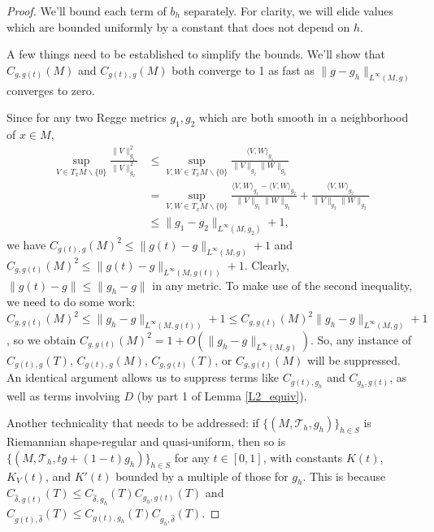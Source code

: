 \documentclass[11pt]{article}
\newcommand{\iprod}[1]{\langle #1 \rangle}
\begin{document}
\begin{proof}
We'll bound each term of $b_h$ separately. For clarity, we will elide values which are bounded uniformly by a constant that does not depend on $h$.

A few things need to be established to simplify the bounds. We'll show that $C_{g,g(t)}(M)$ and $C_{g(t),g}(M)$ both converge to 1 as fast as $\|g - g_h\|_{L^\infty(M,g)}$ converges to zero. 

Since for any two Regge metrics $g_1, g_2$ which are both smooth in a neighborhood of $x \in M$,
\begin{align*}
    \sup_{V \in T_xM \backslash \{0\}} \frac{\|V\|^2_{g_1}}{\|V\|^2_{g_2}} &\le \sup_{V,W \in T_xM \backslash \{0\}} \frac{\iprod{V,W}_{g_1}}{\|V\|_{g_2}\|W\|_{g_2}} \\ &= \sup_{V,W \in T_xM \backslash \{0\}} \frac{\iprod{V,W}_{g_1} - \iprod{V,W}_{g_2}}{\|V\|_{g_2}\|W\|_{g_2}} + \frac{\iprod{V,W}_{g_2}}{\|V\|_{g_2}\|W\|_{g_2}}\\
&\le \|g_1 - g_2\|_{L^\infty(M,g_2)} + 1,
\end{align*}
we have $C_{g(t),g}(M)^2 \le \|g(t) - g\|_{L^\infty(M,g)} + 1$ and $C_{g,g(t)}(M)^2 \le \|g(t) - g\|_{L^\infty(M,g(t))} + 1$. Clearly, $\|g(t) - g\| \le \|g_h - g\|$ in any metric. To make use of the second inequality, we need to do some work: $C_{g,g(t)}(M)^2 \le \|g_h - g\|_{L^\infty(M,g(t))} + 1\le C_{g,g(t)}(M)^2\|g_h - g\|_{L^\infty(M,g)} + 1$, so we obtain
$C_{g,g(t)}(M)^2 = 1 + O(\|g_h - g\|_{L^\infty(M,g)})$. So, any instance of $C_{g(t),g}(T)$, $C_{g(t),g}(M)$, $C_{g,g(t)}(T)$, or $C_{g,g(t)}(M)$ will be suppressed. An identical argument allows us to suppress terms like $C_{g(t),g_h}$ and $C_{g_h,g(t)}$, as well as terms involving $D$ (by part 1 of Lemma \ref{L2_equiv}).

Another technicality that needs to be addressed: if $\{(M,\mathcal{T}_h,g_h)\}_{h \in S}$ is Riemannian shape-regular and quasi-uniform, then so is $\{(M,\mathcal{T}_h,tg + (1-t)g_h)\}_{h \in S}$ for any $t \in [0,1]$, with constants $K(t)$, $K_V(t)$, and $K'(t)$ bounded by a multiple of those for $g_h$. This is because $C_{\hat \delta,g(t)}(T) \le C_{\hat \delta, g_h}(T)C_{g_h,g(t)}(T)$ and $C_{g(t),\hat \delta}(T) \le C_{g(t),g_h}(T)C_{g_h,\hat \delta}(T)$.


\end{proof}
\end{document}
